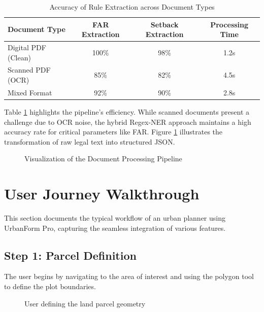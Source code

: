 \documentclass[12pt,a4paper]{report}
\begin{document}
\begin{table}[h]
    \centering
    \begin{tabular}{|l|c|c|c|}
        \hline
        \textbf{Document Type} & \textbf{FAR Extraction} & \textbf{Setback Extraction} & \textbf{Processing Time} \\
        \hline
        Digital PDF (Clean) & 100\% & 98\% & 1.2s \\
        \hline
        Scanned PDF (OCR) & 85\% & 82\% & 4.5s \\
        \hline
        Mixed Format & 92\% & 90\% & 2.8s \\
        \hline
    \end{tabular}
    \caption{Accuracy of Rule Extraction across Document Types}
    \label{tab:nlp-accuracy}
\end{table}

Table \ref{tab:nlp-accuracy} highlights the pipeline's efficiency. While scanned documents present a challenge due to OCR noise, the hybrid Regex-NER approach maintains a high accuracy rate for critical parameters like FAR. Figure \ref{fig:nlp-output} illustrates the transformation of raw legal text into structured JSON.

\begin{figure}[H]
  \centering
  \caption{Visualization of the Document Processing Pipeline}
  \label{fig:nlp-output}
\end{figure}

\section{User Journey Walkthrough}
This section documents the typical workflow of an urban planner using UrbanForm Pro, capturing the seamless integration of various features.

\subsection{Step 1: Parcel Definition}
The user begins by navigating to the area of interest and using the polygon tool to define the plot boundaries.
\begin{figure}[H]
  \centering
  \caption{User defining the land parcel geometry}
\end{figure}
\end{document}
